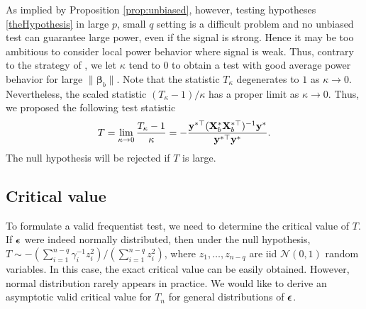 \documentclass[11pt]{article}
\newcommand{\By}{\mathbf{y}}    \newcommand{\Bz}{\mathbf{z}}
\newcommand{\bfsym}[1]{\ensuremath{\boldsymbol{#1}}}
\def\bbeta{\bfsym \beta}
\theoremstyle{plain}
\theoremstyle{definition}
\theoremstyle{remark}
\begin{document}
As implied by Proposition \ref{prop:unbiased}, however, testing hypotheses \eqref{theHypothesis} in large $p$, small $q$ setting is a difficult problem and no unbiased test can guarantee large power, even if the signal is strong.
Hence it may be too ambitious to consider local power behavior where signal is weak.
Thus, contrary to the strategy of \cite{Goeman2006}, we let $\kappa$ tend to $0$ to obtain a test with good average power behavior for large $\|\bbeta_b\|$.
Note that the statistic $ T_{\kappa}$ degenerates to $1$ as $\kappa\to 0$.
Nevertheless, the scaled statistic $(T_{\kappa}-1)/\kappa$ has a proper limit as $\kappa\to 0$.
Thus, we proposed the following test statistic
\begin{equation*}
    T
    =
    \lim_{\kappa\to 0} \frac{T_{\kappa}-1}{\kappa}
    =
    -
     \frac{\By^{*\top} ( \BX_b^* \BX_b^{*\top} )^{-1} \By^* }{\By^{*\top} \By^*} .
\end{equation*}
The null hypothesis will be rejected if $T$ is large.




\subsection{Critical value}
To formulate a valid frequentist test, we need to determine the critical value of $T$.
If $\bepsilon$ were indeed normally distributed, then under the null hypothesis,
    $T \sim
    -
    {(\sum_{i=1}^{n-q} \gamma_i^{-1} z_i^2)}/{(\sum_{i=1}^{n-q} z_i^2)}$,
where $z_1,\ldots, z_{n-q}$ are iid $\mathcal N(0,1)$ random variables.
In this case, the exact critical value can be easily obtained.
However, normal distribution rarely appears in practice.
We would like to derive an asymptotic valid critical value for $T_{n}$ for general distributions of $\bepsilon$.
\end{document}
